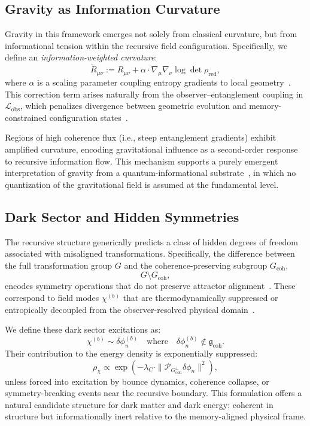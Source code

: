 \documentclass[11pt]{article}
\begin{document}
\subsection{Gravity as Information Curvature}

Gravity in this framework emerges not solely from classical curvature, but from informational tension within the recursive field configuration. Specifically, we define an \emph{information-weighted curvature}:
\[
\widetilde{R}_{\mu\nu} := R_{\mu\nu} + \alpha \cdot \nabla_\mu \nabla_\nu \log \det \rho_{\text{red}},
\]
where $\alpha$ is a scaling parameter coupling entropy gradients to local geometry~\cite{verlinde2011emergent}. This correction term arises naturally from the observer–entanglement coupling in $\mathcal{L}_{\text{obs}}$, which penalizes divergence between geometric evolution and memory-constrained configuration states~\cite{zurek2003decoherence, nielsen2010quantum}.

Regions of high coherence flux (i.e., steep entanglement gradients) exhibit amplified curvature, encoding gravitational influence as a second-order response to recursive information flow. This mechanism supports a purely emergent interpretation of gravity from a quantum-informational substrate~\cite{verlinde2011emergent, maldacena2013cool}, in which no quantization of the gravitational field is assumed at the fundamental level.

\subsection{Dark Sector and Hidden Symmetries}

The recursive structure generically predicts a class of hidden degrees of freedom associated with misaligned transformations. Specifically, the difference between the full transformation group $G$ and the coherence-preserving subgroup $G_{\text{coh}}$,
\[
G \setminus G_{\text{coh}},
\]
encodes symmetry operations that do not preserve attractor alignment~\cite{joyner2008adventures}. These correspond to field modes $\chi^{(b)}$ that are thermodynamically suppressed or entropically decoupled from the observer-resolved physical domain~\cite{zurek2003decoherence}.

We define these dark sector excitations as:
\[
\chi^{(b)} \sim \delta \phi_n^{(b)} \quad \text{where} \quad \delta \phi_n^{(b)} \notin \mathfrak{g}_{\text{coh}}.
\]
Their contribution to the energy density is exponentially suppressed:
\[
\rho_{\chi} \propto \exp\left( - \lambda_C \cdot \| \mathcal{P}_{G_{\text{coh}}^\perp} \delta \phi_n \|^2 \right),
\]
unless forced into excitation by bounce dynamics, coherence collapse, or symmetry-breaking events near the recursive boundary. This formulation offers a natural candidate structure for dark matter and dark energy: coherent in structure but informationally inert relative to the memory-aligned physical frame.
\end{document}
